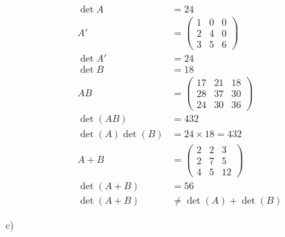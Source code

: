 \documentclass[letterpaper, 11pt]{article}
\newcommand{\1}{\mathds{1}}	%
\theoremstyle{definition}
\begin{document}
\begin{align*}
    \det A &= 24 \\
    A' &= \begin{pmatrix}
        1 & 0 & 0 \\
        2 & 4 & 0 \\
        3 & 5 & 6
    \end{pmatrix} \\
    \det A' &= 24 \\
    \det B &= 18 \\
    AB &= \begin{pmatrix}
        17 & 21 & 18 \\
        28 & 37 & 30 \\
        24 & 30 & 36
    \end{pmatrix} \\
    \det (AB) &= 432\\
    \det (A) \det (B) &= 24 \times 18 = 432 \\
    A + B &=  \begin{pmatrix}
        2 & 2 & 3 \\
        2 & 7 & 5 \\
        4 & 5 & 12
    \end{pmatrix}\\
    \det (A+B) &= 56 \\
    \det (A+B) &\neq \det (A) + \det (B)
\end{align*}

c)
\end{document}
